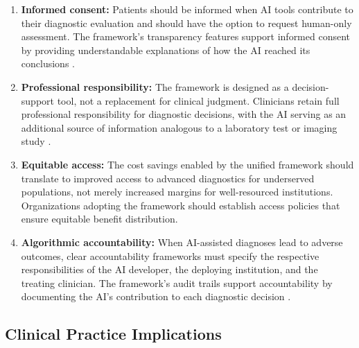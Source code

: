 \begin{enumerate}
    \item \textbf{Informed consent:} Patients should be informed when AI tools contribute to their diagnostic evaluation and should have the option to request human-only assessment. The framework's transparency features support informed consent by providing understandable explanations of how the AI reached its conclusions \cite{char2018ethics}.

    \item \textbf{Professional responsibility:} The framework is designed as a decision-support tool, not a replacement for clinical judgment. Clinicians retain full professional responsibility for diagnostic decisions, with the AI serving as an additional source of information analogous to a laboratory test or imaging study \cite{kelly2019healthcare}.

    \item \textbf{Equitable access:} The cost savings enabled by the unified framework should translate to improved access to advanced diagnostics for underserved populations, not merely increased margins for well-resourced institutions. Organizations adopting the framework should establish access policies that ensure equitable benefit distribution.

    \item \textbf{Algorithmic accountability:} When AI-assisted diagnoses lead to adverse outcomes, clear accountability frameworks must specify the respective responsibilities of the AI developer, the deploying institution, and the treating clinician. The framework's audit trails support accountability by documenting the AI's contribution to each diagnostic decision \cite{jobin2019ethics}.
\end{enumerate}

\subsection{Clinical Practice Implications}
\label{app_j:clinical_practice}

